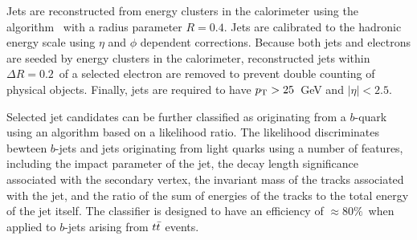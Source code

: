 Jets are reconstructed from energy clusters in the calorimeter using the {\it \AKT} algorithm~\cite{antikt}
with a radius parameter $R = 0.4$.
Jets are calibrated to the hadronic energy scale using $\eta$ and $\phi$ dependent corrections.
Because both jets and electrons are seeded by energy clusters in the calorimeter,
reconstructed jets within $\Delta R=0.2$\ of a selected electron are removed to
prevent double counting of physical objects.
Finally, jets are required to have $p_{\mathrm{T}}>25$~GeV and $|\eta|<2.5$.


Selected jet candidates can be further classified as originating from a
$b$-quark using an algorithm based on a likelihood ratio.
The likelihood discriminates bewteen $b$-jets and jets originating from
light quarks using a number of features, including the impact parameter
of the jet, the decay length significance associated with the secondary
vertex, the invariant mass of the tracks associated with the jet, 
and the ratio of the sum of energies of the tracks to the total
energy of the jet itself.
The classifier is designed to have an efficiency of $\approx 80\%$\
when applied to $b$-jets arising from $t\bar{t}$ events.



